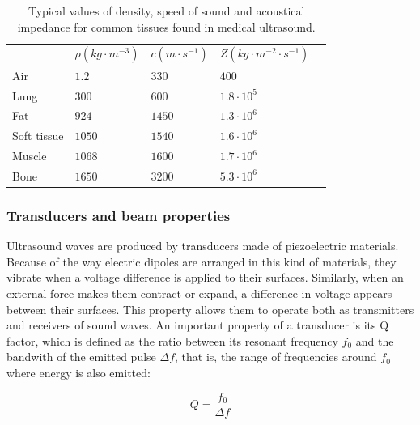 \documentclass[12pt]{article} %
\begin{document}
\begin{table}[]
\centering
\begin{tabular}{l|l|l|l|l}
            & $  \rho (kg  \cdot m^{-3})$ & $c (m \cdot s^{-1})$ & $Z (kg \cdot m^{-2} \cdot s^{-1})$ &  \\ \cline{1-4}
Air         & $1.2$                       & $330$                & $400$                              &  \\
Lung        & $300$                       & $600$                & $1.8 \cdot 10^5$                   &  \\
Fat         & $924$                       & $1450$                & $1.3 \cdot 10^6$                   &  \\
Soft tissue & $1050$                      & $1540$               & $1.6 \cdot 10^6$                   &  \\
Muscle      & $1068$                      & $1600$               & $1.7 \cdot 10^6$                   & \\
Bone        & $1650$                      & $3200$               & $5.3 \cdot 10^6$                   & 
\end{tabular}
\caption{\small Typical values of density, speed of sound and acoustical impedance for common tissues found in medical ultrasound. \cite{farr}}
\label{tissues}
\end{table}


\subsubsection{Transducers and beam properties}


	Ultrasound waves are produced by transducers made of piezoelectric materials. Because of the way electric dipoles are arranged in this kind of materials, they vibrate when a voltage difference is applied to their surfaces. Similarly, when an external force makes them contract or expand, a difference in voltage appears between their surfaces. This property allows them to operate both as transmitters and receivers of sound waves. An important property of a transducer is its Q factor, which is defined as the ratio between its resonant frequency $f_0$ and the bandwith of the emitted pulse $ \Delta f$, that is, the range of frequencies around $f_0$ where energy is also emitted: 
	
\begin{equation}
Q = \frac{f_0}{\Delta f} 
\end{equation}
\end{document}
